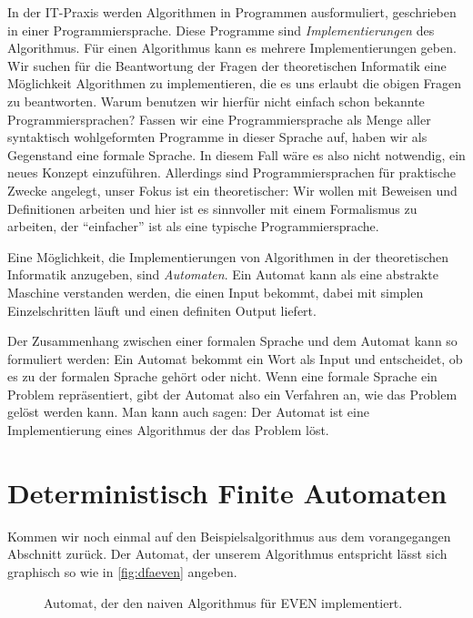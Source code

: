 In der IT-Praxis werden Algorithmen in Programmen ausformuliert,
geschrieben in einer Programmiersprache.
Diese Programme sind \emph{Implementierungen} des Algorithmus.
Für einen Algorithmus kann es mehrere Implementierungen geben. 
Wir suchen für die Beantwortung der Fragen der theoretischen Informatik
eine Möglichkeit Algorithmen zu implementieren,
die es uns erlaubt die obigen Fragen zu beantworten.
Warum benutzen wir hierfür nicht einfach schon bekannte Programmiersprachen?
Fassen wir eine Programmiersprache als
Menge aller syntaktisch wohlgeformten Programme in dieser Sprache auf, 
haben wir als Gegenstand eine formale Sprache.
In diesem Fall wäre es also nicht notwendig,
ein neues Konzept einzuführen.
Allerdings sind Programmiersprachen für praktische Zwecke angelegt,
unser Fokus ist ein theoretischer:
Wir wollen mit Beweisen und Definitionen arbeiten
und hier ist es sinnvoller mit einem Formalismus zu arbeiten,
der ``einfacher'' ist als eine typische Programmiersprache.

Eine Möglichkeit,
die Implementierungen von Algorithmen in der theoretischen Informatik
anzugeben, sind \emph{Automaten}.
Ein Automat kann als eine abstrakte Maschine verstanden werden,
die einen Input bekommt, 
dabei mit simplen Einzelschritten läuft
und einen definiten Output liefert.

Der Zusammenhang zwischen einer formalen Sprache und dem Automat kann so formuliert werden:
Ein Automat bekommt ein Wort als Input und entscheidet,
ob es zu der formalen Sprache gehört oder nicht.
Wenn eine formale Sprache ein Problem repräsentiert,
gibt der Automat also ein Verfahren an, 
wie das Problem gelöst werden kann.
Man kann auch sagen:
Der Automat ist eine Implementierung eines Algorithmus der das Problem löst.

\section{Deterministisch Finite Automaten}

Kommen wir noch einmal auf den Beispielsalgorithmus aus dem vorangegangen Abschnitt zurück.
Der Automat,
der unserem Algorithmus entspricht lässt sich graphisch so
wie in \autoref{fig:dfaeven} angeben.

\begin{figure}[ht] %
\centering %
\caption{Automat, der den naiven Algorithmus für EVEN implementiert.}
\label{fig:dfaeven}
\end{figure}


